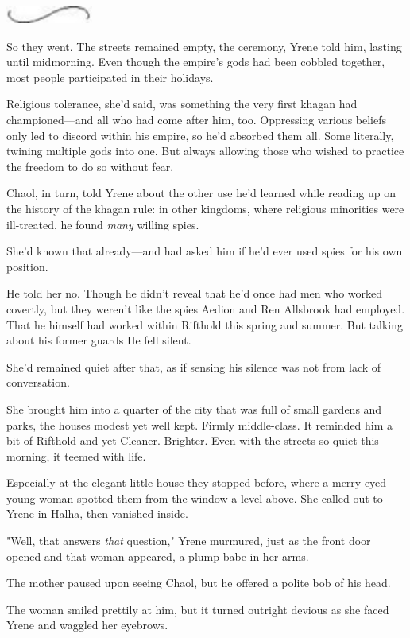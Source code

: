 \includegraphics[width=1.12in,height=0.24in]{images/seperator}

So they went. The streets remained empty, the ceremony, Yrene told him, lasting until midmorning. Even though the empire's gods had been cobbled together, most people participated in their holidays.

Religious tolerance, she'd said, was something the very first khagan had championed---and all who had come after him, too. Oppressing various beliefs only led to discord within his empire, so he'd absorbed them all. Some literally, twining multiple gods into one. But always allowing those who wished to practice the freedom to do so without fear.

Chaol, in turn, told Yrene about the other use he'd learned while reading up on the history of the khagan rule: in other kingdoms, where religious minorities were ill-treated, he found \emph{many} willing spies.

She'd known that already---and had asked him if he'd ever used spies for his own  position.

He told her no. Though he didn't reveal that he'd once had men who worked covertly, but they weren't like the spies Aedion and Ren Allsbrook had employed. That he himself had worked within Rifthold this spring and summer. But talking about his former guards  He fell silent.

She'd remained quiet after that, as if sensing his silence was not from lack of conversation.

She brought him into a quarter of the city that was full of small gardens and parks, the houses modest yet well kept. Firmly middle-class. It reminded him a bit of Rifthold and yet  Cleaner. Brighter. Even with the streets so quiet this morning, it teemed with life.

Especially at the elegant little house they stopped before, where a merry-eyed young woman spotted them from the window a level above. She called out to Yrene in Halha, then vanished inside.

"Well, that answers \emph{that} question," Yrene murmured, just as the front door opened and that woman appeared, a plump babe in her arms.

The mother paused upon seeing Chaol, but he offered a polite bob of his head.

The woman smiled prettily at him, but it turned outright devious as she faced Yrene and waggled her eyebrows.


